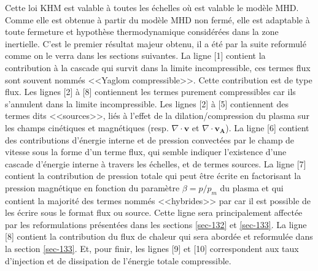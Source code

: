 Cette loi \acs{KHM} est valable à toutes les échelles où est valable le modèle \ac{MHD}. Comme elle est obtenue à partir du modèle \ac{MHD} non fermé, elle est adaptable à toute fermeture et hypothèse thermodynamique considérées dans la zone inertielle. C'est le premier résultat majeur obtenu, il a été par la suite reformulé comme on le verra dans les sections suivantes. La ligne [1] contient la contribution à la cascade qui survit dans la limite incompressible, ces termes flux sont souvent nommés <<Yaglom compressible>>. Cette contribution est de type flux. Les lignes [2] à [8] contiennent les termes purement compressibles car ils s'annulent dans la limite incompressible. Les lignes [2] à [5] contiennent des termes dits <<sources>>, liés à l'effet de la dilation/compression du plasma sur les champs cinétiques et magnétiques (resp. $\nabla \cdot \boldsymbol{v}$ et $\nabla \cdot \boldsymbol{v_A}$). La ligne [6] contient des contributions d'énergie interne et de pression convectées par le champ de vitesse sous la forme d'un terme flux, qui semble indiquer l'existence d'une cascade d'énergie interne à travers les échelles, et de termes sources. La ligne [7] contient la contribution de pression totale qui peut être écrite en factorisant la pression magnétique en fonction du paramètre $\beta = p/p_m$ du plasma et qui contient la majorité des termes nommés <<hybrides>> par \cite{andres_alternative_2017} car il est possible de les écrire sous le format flux ou source. Cette ligne sera principalement affectée par les reformulations présentées dans les sections \ref{sec-132} et \ref{sec-133}. La ligne [8] contient la contribution du flux de chaleur qui sera abordée et reformulée dans la section \ref{sec-133}. Et, pour finir, les lignes [9] et [10] correspondent aux taux d'injection et de dissipation de l'énergie totale compressible. 

